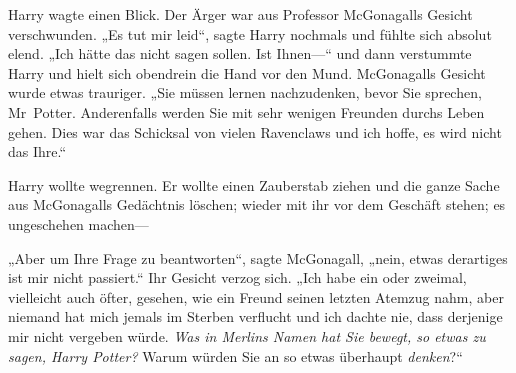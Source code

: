 Harry wagte einen Blick. Der Ärger war aus Professor McGonagalls Gesicht verschwunden. „Es tut mir leid“, sagte Harry nochmals und fühlte sich absolut elend. „Ich hätte das nicht sagen sollen. Ist Ihnen—“ und dann verstummte Harry und hielt sich obendrein die Hand vor den Mund. McGonagalls Gesicht wurde etwas trauriger. „Sie müssen lernen nachzudenken, bevor Sie sprechen, Mr~Potter. Anderenfalls werden Sie mit sehr wenigen Freunden durchs Leben gehen. Dies war das Schicksal von vielen Ravenclaws und ich hoffe, es wird nicht das Ihre.“

Harry wollte wegrennen. Er wollte einen Zauberstab ziehen und die ganze Sache aus McGonagalls Gedächtnis löschen; wieder mit ihr vor dem Geschäft stehen; es ungeschehen machen—

„Aber um Ihre Frage zu beantworten“, sagte McGonagall, „nein, etwas derartiges ist mir nicht passiert.“ Ihr Gesicht verzog sich. „Ich habe ein oder zweimal, vielleicht auch öfter, gesehen, wie ein Freund seinen letzten Atemzug nahm, aber niemand hat mich jemals im Sterben verflucht und ich dachte nie, dass derjenige mir nicht vergeben würde. \emph{Was in Merlins Namen hat Sie bewegt, so etwas zu sagen, Harry Potter?} Warum würden Sie an so etwas überhaupt \emph{denken}?“

